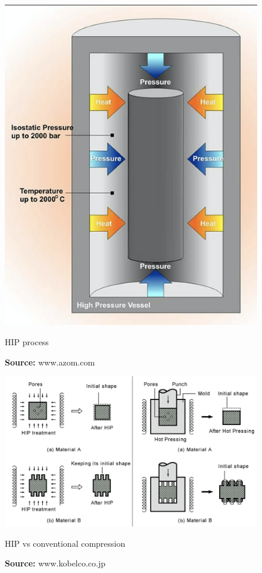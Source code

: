 \begin{figure}[h]
  \centering
  \begin{minipage}[b]{0.3\textwidth}
    \includegraphics[width=\textwidth]{./Images/hp1.png}
    \caption{HIP process}
    \label{hip1}
    \caption*{\textbf{Source:} www.azom.com}
  \end{minipage}
  \hfill
  \begin{minipage}[b]{0.5\textwidth}
    \includegraphics[width=\textwidth]{./Images/hp2.png}
    \caption{HIP vs conventional compression}
    \label{hip2}
        \caption*{\textbf{Source:} www.kobelco.co.jp}
  \end{minipage}
\end{figure}



